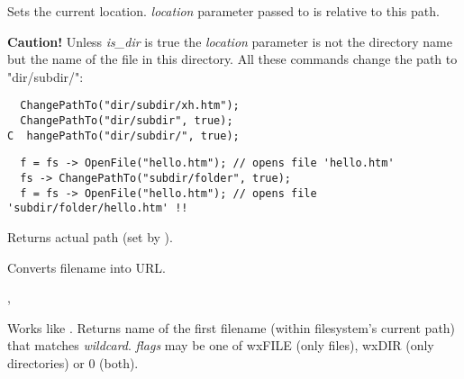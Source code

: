 Sets the current location. {\it location} parameter passed to 
 is relative to this path.

{\bf Caution! } Unless {\it is\_dir} is true the {\it location} parameter
is not the directory name but the name of the file in this directory. All these
commands change the path to "dir/subdir/":

\begin{verbatim}
  ChangePathTo("dir/subdir/xh.htm");
  ChangePathTo("dir/subdir", true);
C  hangePathTo("dir/subdir/", true);
\end{verbatim}





\begin{verbatim}
  f = fs -> OpenFile("hello.htm"); // opens file 'hello.htm'
  fs -> ChangePathTo("subdir/folder", true);
  f = fs -> OpenFile("hello.htm"); // opens file 'subdir/folder/hello.htm' !!
\end{verbatim}

\label{wxfilesystemgetpath}


Returns actual path (set by ).

\label{wxfilesystemfilenametourl}


Converts filename into URL.


,

\label{wxfilesystemfindfirst}


Works like . Returns name of the first
filename (within filesystem's current path) that matches {\it wildcard}. {\it flags} may be one of
wxFILE (only files), wxDIR (only directories) or 0 (both).

